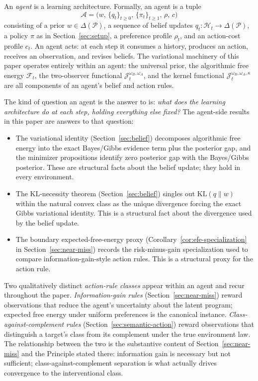 \documentclass[11pt]{article}
\theoremstyle{definition}
\theoremstyle{remark}
\theoremstyle{plain}
\theoremstyle{definition}
\newcommand{\Acal}{\mathcal{A}}
\newcommand{\Pcal}{\mathcal{P}}
\newcommand{\Hcal}{\mathcal{H}}
\newcommand{\Fcal}{\mathcal{F}}
\newcommand{\KL}{\mathrm{KL}}
\begin{document}
An \emph{agent} is a learning architecture. Formally, an agent is a tuple
\[
\Acal=\bigl(w,\,\{q_t\}_{t\ge0},\,\{\pi_t\}_{t\ge1},\,\rho,\,c\bigr)
\]
consisting of a prior $w\in\Delta(\Pcal)$, a sequence of belief updates $q_t:\Hcal_t\to\Delta(\Pcal)$, a policy $\pi$ as in Section~\ref{sec:setup}, a preference profile $\rho_t$, and an action-cost profile $c_t$. An agent acts: at each step it consumes a history, produces an action, receives an observation, and revises beliefs. The variational machinery of this paper operates entirely within an agent: the universal prior, the algorithmic free energy $\Fcal_t$, the two-observer functional $\mathcal J_t^{\omega_B,\omega_A}$, and the kernel functional $\mathcal J_t^{\omega_B,\omega_A,\kappa}$ are all components of an agent's belief and action rules.

The kind of question an agent is the answer to is: \emph{what does the learning architecture do at each step, holding everything else fixed?} The agent-side results in this paper are answers to that question:
\begin{itemize}
\item The variational identity (Section~\ref{sec:belief}) decomposes algorithmic free energy into the exact Bayes/Gibbs evidence term plus the posterior gap, and the minimizer propositions identify zero posterior gap with the Bayes/Gibbs posterior. These are structural facts about the belief update; they hold in every environment.
\item The KL-necessity theorem (Section~\ref{sec:belief}) singles out $\KL(q\|w)$ within the natural convex class as the unique divergence forcing the exact Gibbs variational identity. This is a structural fact about the divergence used by the belief update.
\item The boundary expected-free-energy proxy (Corollary~\ref{cor:efe-specialization} in Section~\ref{sec:near-miss}) records the risk-minus-gain specialization used to compare information-gain-style action rules. This is a structural proxy for the action rule.
\end{itemize}
Two qualitatively distinct \emph{action-rule classes} appear within an agent and recur throughout the paper. \emph{Information-gain rules} (Section~\ref{sec:near-miss}) reward observations that reduce the agent's uncertainty about the latent program; expected free energy under uniform preferences is the canonical instance. \emph{Class-against-complement rules} (Section~\ref{sec:semantic-action}) reward observations that distinguish a target's class from its complement under the true environment law. The relationship between the two is the substantive content of Section~\ref{sec:near-miss} and the Principle stated there: information gain is necessary but not sufficient; class-against-complement separation is what actually drives convergence to the interventional class.
\end{document}
